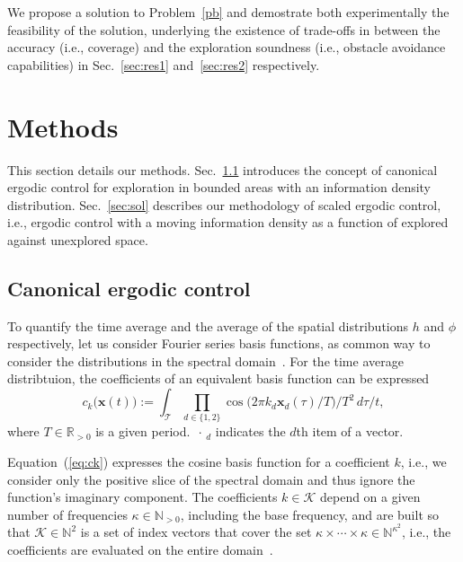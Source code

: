 \documentclass[letterpaper,10pt,conference,twoside]{IEEEtran}
\theoremstyle{definition}
\begin{document}
We propose a solution to Problem~\ref{pb} and demostrate both experimentally the feasibility of the solution, underlying the existence of trade-offs in between the accuracy (i.e., coverage) and the exploration soundness (i.e., obstacle avoidance capabilities) in Sec.~\ref{sec:res1} and~\ref{sec:res2} respectively.

\section{Methods}\label{sec:meth}
\noindent
This section details our methods. Sec.~\ref{sec:canon} introduces the concept of canonical ergodic control for exploration in bounded areas with an information density distribution. Sec.~\ref{sec:sol} describes our methodology of scaled ergodic control, i.e., ergodic control with a moving information density as a function of explored against unexplored space.

\subsection{Canonical ergodic control}
\label{sec:canon}
\noindent
To quantify the time average and the average of the spatial distributions $h$ and $\phi$ respectively, let us consider Fourier series basis functions, as common way to consider the distributions in the spectral domain~\cite{mathew2011metrics}. For the time average distribtuion, the coefficients of an equivalent basis function can be expressed
\begin{equation}\label{eq:ck}
  c_k\big(\mathbf{x}(t)\big):=\int_{\mathcal{T}}{\prod_{d\in\{1,2\}}}{\cos{\big(2\pi k_d\mathbf{x}_d(\tau)/T\big)}/T^2}\,d\tau/t,
\end{equation}
where $T\in\mathbb{R}_{>0}$ is a given period. $\,\cdot\,_d$ indicates the $d$th item of a vector. %

Equation~(\ref{eq:ck}) expresses the cosine basis function for a coefficient $k$, i.e., we consider only the positive slice of the spectral domain and thus ignore the function's imaginary component. The coefficients $k\in\mathcal{K}$ depend on a given number of frequencies $\kappa\in\mathbb{N}_{>0}$, including the base frequency, and are built so that $\mathcal{K}\in\mathbb{N}^2$ is a set of index vectors that cover the set $\kappa\times\cdots\times\kappa\in\mathbb{N}^{\kappa^2}$, i.e., the coefficients are evaluated on the entire domain~\cite{calinon2020mixture}.
\end{document}
